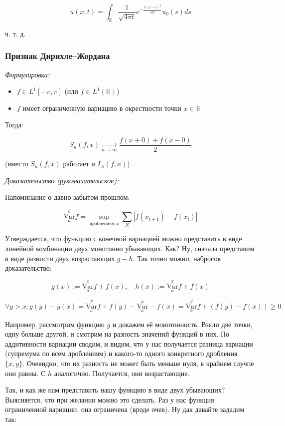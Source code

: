 \documentclass{article}
\def\goesto#1{\underset{#1}{\longrightarrow}}
\def\toinf#1{\goesto{#1 \rightarrow \infty}}
\def\ntoinf{\toinf{n}}
\def\Var#1#2{\overset{#2}{\underset{#1}{\text{Var}}}}
\begin{document}
\[u(x, t) = \int_{\mathbb{R}} \frac{1}{\sqrt{4 \pi t}} e^{-\frac{\pi (x - s)^2}{4 \pi t}} u_0(s)ds\]

ч. т. д. 

\subsubsection{Признак Дирихле--Жордана}
\textit{Формулировка:}

\begin{itemize}
    \item $f \in L^1[-\pi, \pi]$ (или $f \in L^1(\mathbb{R})$)
    \item $f$ имеет ограниченную вариацию в окрестности точки $x \in \mathbb{R}$
\end{itemize}

Тогда:

\[S_n(f, x) \ntoinf \frac{f(x + 0) + f(x - 0)}{2}\]

(вместо $S_n(f, x)$ работает и $I_A(f, x)$)

\textit{Доказательство (рукомахательское):}

Напоминание о давно забытом прошлом:

\[\Var{a}{b} f  = \sup_{\text{дроблениям } x} \sum_{N} |f(x_{i + 1}) - f(x_i)|\]

Утверждается, что функцию с конечной вариацией можно представить в виде линейной комбинации двух монотонно убывающих. Как? Ну, сначала представим в виде разности двух возрастающих $g - h$. Так точно можно, набросок доказательство:

\[g(x) := \Var{a}{x} f + f(x), \quad h(x) := \Var{a}{x} f + f(x)\]

\[\forall y > x : g(y) - g(x) = \Var{a}{y} f + f(y) - \Var{a}{x} - f(x) = \Var{x}{y} f + (f(y) - f(x)) \ge 0\]

Например, рассмотрим функцию $g$ и докажем её монотонность. Взяли две точки, одну больше другой, и смотрим на разность значений функций в них. По аддитивности вариации сводим, и видим, что у нас получается разница вариации (супремума по всем дроблениям) и какого-то одного конкретного дробления $\{x, y\}$. Очевидно, что их разность не может быть меньше нуля, в крайнем случпе они равны. С $h$ аналогично. Получается, они возрастающие.

Так, и как же нам представить нашу функцию в виде двух убывающих? Выясняется, что при желании можно это сделать. Раз у нас функция ограниченной вариации, она ограничена (вроде очев). Ну дак давайте зададим так:
\end{document}
